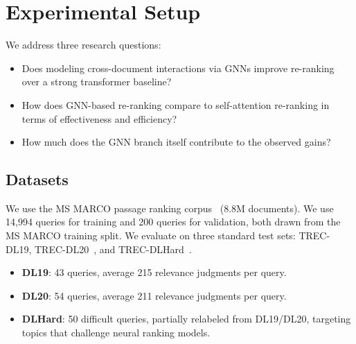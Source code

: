 \documentclass[runningheads]{llncs}
\begin{document}
\section{Experimental Setup}
We address three research questions:
\begin{itemize}[leftmargin=1.1cm]
\item[\textbf{RQ1.}] Does modeling cross-document interactions via GNNs improve re-ranking over a strong transformer baseline?
\item[\textbf{RQ2.}] How does GNN-based re-ranking compare to self-attention re-ranking in terms of effectiveness and efficiency?
\item[\textbf{RQ3.}] How much does the GNN branch itself contribute to the observed gains?
\end{itemize}

\subsection{Datasets}
We use the MS MARCO passage ranking corpus~\cite{msmarco} (8.8M documents). We use 14,994 queries for training and 200 queries for validation, both drawn from the MS MARCO training split. We evaluate on three standard test sets: TREC-DL19, TREC-DL20~\cite{dl19-20}, and TREC-DLHard~\cite{dl-hard}.
\begin{itemize}
    \item \textbf{DL19}: 43 queries, average 215 relevance judgments per query.
    \item \textbf{DL20}: 54 queries, average 211 relevance judgments per query.
    \item \textbf{DLHard}: 50 difficult queries, partially relabeled from DL19/DL20, targeting topics that challenge neural ranking models.
\end{itemize}
\end{document}
